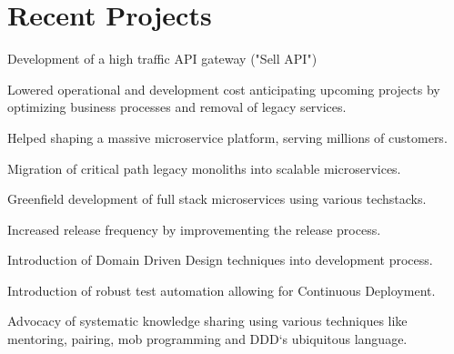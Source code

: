 \documentclass[]{resume}
\begin{document}
\hfill
\begin{minipage}[t]{0.66\textwidth} 


\section{Recent Projects}

\vspace{\topsep} %
\begin{tightemize}\item Development of a high traffic API gateway ("Sell API")
\end{tightemize}
\sectionsep

\begin{tightemize}\item Lowered operational and development cost anticipating upcoming projects by optimizing business processes and removal of legacy services.
\end{tightemize}
\sectionsep

\begin{tightemize}
\item Helped shaping a massive microservice platform, serving millions of customers.
\item Migration of critical path legacy monoliths into scalable microservices.
\item Greenfield development of full stack microservices using various techstacks.
\item Increased release frequency by improvementing the release process.
\item Introduction of Domain Driven Design techniques into development process.
\item Introduction of robust test automation allowing for Continuous Deployment.
\item Advocacy of systematic knowledge sharing using various techniques like mentoring, pairing, mob programming and DDD`s ubiquitous language.

\end{tightemize}
\sectionsep



\end{minipage}
\end{document}
